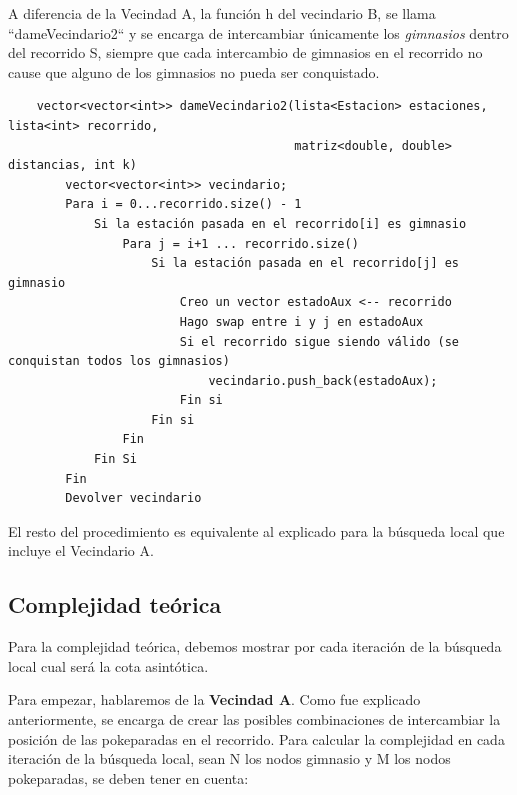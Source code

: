     \par A diferencia de la Vecindad A, la función h del vecindario B, se llama “dameVecindario2“ y se encarga de intercambiar únicamente los \emph{gimnasios} dentro del recorrido S, siempre que cada intercambio de gimnasios en el recorrido no cause que alguno de los gimnasios no pueda ser conquistado.

    \begin{codesnippet}
    \begin{verbatim}
    vector<vector<int>> dameVecindario2(lista<Estacion> estaciones, lista<int> recorrido,
                                        matriz<double, double> distancias, int k)
        vector<vector<int>> vecindario;
        Para i = 0...recorrido.size() - 1
            Si la estación pasada en el recorrido[i] es gimnasio
                Para j = i+1 ... recorrido.size()
                    Si la estación pasada en el recorrido[j] es gimnasio
                        Creo un vector estadoAux <-- recorrido
                        Hago swap entre i y j en estadoAux
                        Si el recorrido sigue siendo válido (se conquistan todos los gimnasios)
                            vecindario.push_back(estadoAux);
                        Fin si
                    Fin si
                Fin
            Fin Si
        Fin
        Devolver vecindario
    \end{verbatim}
    \end{codesnippet}
    
    \par El resto del procedimiento es equivalente al explicado para la búsqueda local que incluye el Vecindario A.
   
    \subsection{Complejidad teórica}
        Para la complejidad teórica, debemos mostrar por cada iteración de la búsqueda local cual será la cota asintótica. 
        \par Para empezar, hablaremos de la \textbf{Vecindad A}. Como fue explicado anteriormente, se encarga de crear las posibles combinaciones de intercambiar la posición de las pokeparadas en el recorrido. Para calcular la complejidad en cada iteración de la búsqueda local, sean N los nodos gimnasio y M los nodos pokeparadas, se deben tener en cuenta:

